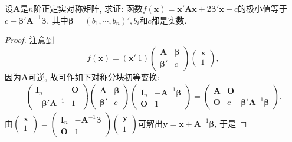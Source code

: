 \documentclass[../../main.tex]{subfiles}
\begin{document}
\begin{example}
设$\boldsymbol{A}$是$n$阶正定实对称矩阵, 求证: 函数$f(\boldsymbol{x})=\boldsymbol{x}'\boldsymbol{A}\boldsymbol{x}+2\boldsymbol{\beta}'\boldsymbol{x}+c$的极小值等于$c - \boldsymbol{\beta}'\boldsymbol{A}^{-1}\boldsymbol{\beta}$, 其中$\boldsymbol{\beta}=(b_1, \cdots, b_n)', b_i$和$c$都是实数.
\end{example}
\begin{proof}
注意到
\[
f(\boldsymbol{x})=(\boldsymbol{x}'\ 1)\begin{pmatrix}
\boldsymbol{A} & \boldsymbol{\beta} \\
\boldsymbol{\beta}' & c
\end{pmatrix}\begin{pmatrix}
\boldsymbol{x} \\
1
\end{pmatrix},
\]
因为$\boldsymbol{A}$可逆, 故可作如下对称分块初等变换:
\begin{align*}
\begin{pmatrix}
\boldsymbol{I}_n & \boldsymbol{O} \\
-\boldsymbol{\beta}'\boldsymbol{A}^{-1} & 1
\end{pmatrix}
\begin{pmatrix}
\boldsymbol{A} & \boldsymbol{\beta} \\
\boldsymbol{\beta}' & c
\end{pmatrix}
\begin{pmatrix}
\boldsymbol{I}_n & -\boldsymbol{A}^{-1}\boldsymbol{\beta} \\
\boldsymbol{O} & 1
\end{pmatrix}
=
\begin{pmatrix}
\boldsymbol{A} & \boldsymbol{O} \\
\boldsymbol{O} & c - \boldsymbol{\beta}'\boldsymbol{A}^{-1}\boldsymbol{\beta}
\end{pmatrix}.
\end{align*}
由$\begin{pmatrix}
\boldsymbol{x} \\
1
\end{pmatrix}=\begin{pmatrix}
\boldsymbol{I}_n & -\boldsymbol{A}^{-1}\boldsymbol{\beta} \\
\boldsymbol{O} & 1
\end{pmatrix}\begin{pmatrix}
\boldsymbol{y} \\
1
\end{pmatrix}$可解出$\boldsymbol{y}=\boldsymbol{x}+\boldsymbol{A}^{-1}\boldsymbol{\beta}$, 于是

\end{proof}
\end{document}
